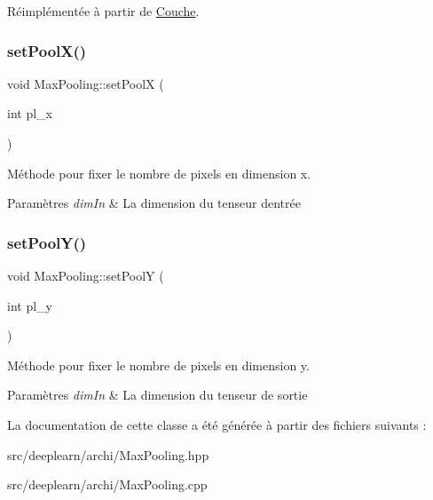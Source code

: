 Réimplémentée à partir de \hyperlink{classCouche_a1f0ed59e21020f5d4f37933af4d1b1e5}{Couche}.

\mbox{\label{classMaxPooling_ae70dd14b2ebe5963b3a6904ca86857bc}} 
\subsubsection{\texorpdfstring{set\+Pool\+X()}{setPoolX()}}
{\footnotesize\ttfamily void Max\+Pooling\+::set\+PoolX (\begin{DoxyParamCaption}\item[{int}]{pl\+\_\+x }\end{DoxyParamCaption})}



Méthode pour fixer le nombre de pixels en dimension x. 


\begin{DoxyParams}{Paramètres}
{\em dim\+In} & La dimension du tenseur d\textquotesingle{}entrée \\
\hline
\end{DoxyParams}
\mbox{\label{classMaxPooling_abf21b8f9da67780af60a588a543f7a1b}} 
\subsubsection{\texorpdfstring{set\+Pool\+Y()}{setPoolY()}}
{\footnotesize\ttfamily void Max\+Pooling\+::set\+PoolY (\begin{DoxyParamCaption}\item[{int}]{pl\+\_\+y }\end{DoxyParamCaption})}



Méthode pour fixer le nombre de pixels en dimension y. 


\begin{DoxyParams}{Paramètres}
{\em dim\+In} & La dimension du tenseur de sortie \\
\hline
\end{DoxyParams}


La documentation de cette classe a été générée à partir des fichiers suivants \+:\begin{DoxyCompactItemize}
\item 
src/deeplearn/archi/Max\+Pooling.\+hpp\item 
src/deeplearn/archi/Max\+Pooling.\+cpp\end{DoxyCompactItemize}
